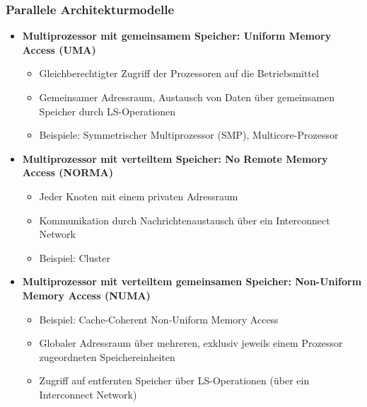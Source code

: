 \subsubsection{Parallele Architekturmodelle}
\begin{itemize}
	\item \textbf{Multiprozessor mit gemeinsamem Speicher: Uniform Memory Access (UMA)}
	\begin{itemize}
		\item Gleichberechtigter Zugriff der Prozessoren auf die Betriebsmittel
		\item Gemeinsamer Adressraum, Austausch von Daten über gemeinsamen Speicher durch LS-Operationen
		\item Beispiele: Symmetrischer Multiprozessor (SMP), Multicore-Prozessor
	\end{itemize}
	\item \textbf{Multiprozessor mit verteiltem Speicher: No Remote Memory Access (NORMA)}
	\begin{itemize}
		\item Jeder Knoten mit einem privaten Adressraum
		\item Kommunikation durch Nachrichtenaustausch über ein Interconnect Network
		\item Beispiel: Cluster
	\end{itemize}
	\item \textbf{Multiprozessor mit verteiltem gemeinsamen Speicher: Non-Uniform Memory Access (NUMA)}
	\begin{itemize}
		\item Beispiel: Cache-Coherent Non-Uniform Memory Access
		\item Globaler Adressraum über mehreren, exklusiv jeweils einem Prozessor zugeordneten Speichereinheiten
		\item Zugriff auf entfernten Speicher über LS-Operationen (über ein Interconnect Network)
	\end{itemize}
\end{itemize}


